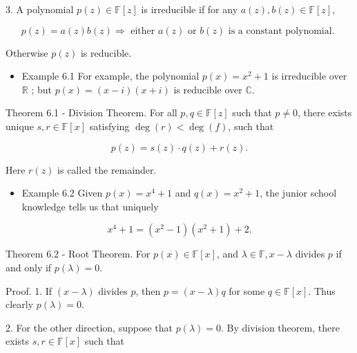 \documentclass[11pt]{article}
\begin{document}
3. A polynomial \(p\left( z\right)  \in  \mathbb{F}\left\lbrack  z\right\rbrack\) is irreducible if for any \(a\left( z\right) ,b\left( z\right)  \in  \mathbb{F}\left\lbrack  z\right\rbrack\),

\[
p\left( z\right)  = a\left( z\right) b\left( z\right)  \Rightarrow  \text{ either }a\left( z\right) \text{ or }b\left( z\right) \text{ is a constant polynomial. }
\]

Otherwise \(p\left( z\right)\) is reducible.

\begin{itemize}
\item Example 6.1 For example, the polynomial \(p\left( x\right)  = {x}^2 + 1\) is irreducible over \(\mathbb{R}\) ; but \(p\left( x\right)  = \left( {x - i}\right) \left( {x + i}\right)\) is reducible over \(\mathbb{C}\).
\end{itemize}

Theorem 6.1 - Division Theorem. For all \(p,q \in  \mathbb{F}\left\lbrack  z\right\rbrack\) such that \(p \neq  0\), there exists unique \(s,r \in  \mathbb{F}\left\lbrack  x\right\rbrack\) satisfying \(\deg \left( r\right)  < \deg \left( f\right)\), such that

\[
p\left( z\right)  = s\left( z\right)  \cdot  q\left( z\right)  + r\left( z\right) .
\]

Here \(r\left( z\right)\) is called the remainder.

\begin{itemize}
\item Example 6.2 Given \(p\left( x\right)  = {x}^{4} + 1\) and \(q\left( x\right)  = {x}^2 + 1\), the junior school knowledge tells us that uniquely
\end{itemize}

\[
{x}^{4} + 1 = \left( {{x}^2 - 1}\right) \left( {{x}^2 + 1}\right)  + 2.
\]

Theorem 6.2 - Root Theorem. For \(p\left( x\right)  \in  \mathbb{F}\left\lbrack  x\right\rbrack\), and \(\lambda  \in  \mathbb{F},x - \lambda\) divides \(p\) if and only if \(p\left( \lambda \right)  = 0\).

Proof. 1. If \(\left( {x - \lambda }\right)\) divides \(p\), then \(p = \left( {x - \lambda }\right) q\) for some \(q \in  \mathbb{F}\left\lbrack  x\right\rbrack\). Thus clearly \(p\left( \lambda \right)  = 0\).

2. For the other direction, suppose that \(p\left( \lambda \right)  = 0\). By division theorem, there exists \(s,r \in  \mathbb{F}\left\lbrack  x\right\rbrack\) such that
\end{document}
